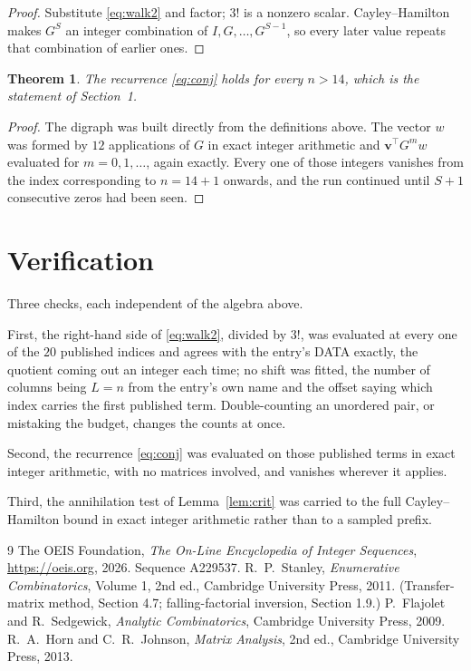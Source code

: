 \documentclass[11pt,a4paper]{article}
\theoremstyle{plain}
\newtheorem{theorem}{Theorem}
\theoremstyle{definition}
\begin{document}
\begin{proof}
Substitute \eqref{eq:walk2} and factor; $3!$ is a nonzero scalar. Cayley--Hamilton
makes $G^{S}$ an integer combination of $I,G,\dots,G^{S-1}$, so every later value repeats
that combination of earlier ones.
\end{proof}

\begin{theorem}
The recurrence \eqref{eq:conj} holds for every $n>14$, which is the statement of
Section~1.
\end{theorem}

\begin{proof}
The digraph was built directly from the definitions above. The vector $w$ was formed by
$12$ applications of $G$ in exact integer arithmetic and $\mathbf{v}^{\!\top}G^{m}w$
evaluated for $m=0,1,\dots$, again exactly. Every one of those integers vanishes from the
index corresponding to $n=14+1$ onwards, and the run continued until $S+1$ consecutive
zeros had been seen.
\end{proof}

\section{Verification}

Three checks, each independent of the algebra above.

First, the right-hand side of \eqref{eq:walk2}, divided by $3!$, was evaluated at every
one of the $20$ published indices and agrees with the entry's DATA exactly, the quotient
coming out an integer each time; no shift was fitted, the number of columns being $L=n$
from the entry's own name and the offset saying which index carries the first published term.
Double-counting an unordered pair, or mistaking the budget, changes the counts at once.

Second, the recurrence \eqref{eq:conj} was evaluated on those published terms in exact
integer arithmetic, with no matrices involved, and vanishes wherever it applies.

Third, the annihilation test of Lemma~\ref{lem:crit} was carried to the full
Cayley--Hamilton bound in exact integer arithmetic rather than to a sampled prefix.

\begin{thebibliography}{9}
 The OEIS Foundation, \emph{The On-Line Encyclopedia of Integer
Sequences}, \url{https://oeis.org}, 2026. Sequence A229537.
 R.~P.~Stanley, \emph{Enumerative Combinatorics}, Volume 1, 2nd ed.,
Cambridge University Press, 2011. (Transfer-matrix method, Section 4.7; falling-factorial
inversion, Section 1.9.)
 P.~Flajolet and R.~Sedgewick, \emph{Analytic Combinatorics}, Cambridge
University Press, 2009.
 R.~A.~Horn and C.~R.~Johnson, \emph{Matrix Analysis}, 2nd ed., Cambridge
University Press, 2013.
\end{thebibliography}
\end{document}
